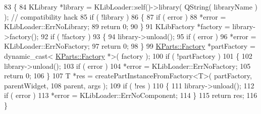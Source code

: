 \begin{DoxyCode}
83         \{
84             KLibrary *library = KLibLoader::self()->library( QString( libraryName ) ); \textcolor{comment}{// compatibility
       hack}
85             \textcolor{keywordflow}{if} ( !library )
86             \{
87                 \textcolor{keywordflow}{if} ( error )
88                     *error = KLibLoader::ErrNoLibrary;
89                 \textcolor{keywordflow}{return} 0;
90             \}
91             KLibFactory *factory = library->factory();
92             \textcolor{keywordflow}{if} ( !factory )
93             \{
94                 library->unload();
95                 \textcolor{keywordflow}{if} ( error )
96                     *error = KLibLoader::ErrNoFactory;
97                 \textcolor{keywordflow}{return} 0;
98             \}
99             \hyperlink{classKParts_1_1Factory}{KParts::Factory} *partFactory = \textcolor{keyword}{dynamic\_cast<}
      \hyperlink{classKParts_1_1Factory}{KParts::Factory} *\textcolor{keyword}{>}( factory );
100             \textcolor{keywordflow}{if} ( !partFactory )
101             \{
102                 library->unload();
103                 \textcolor{keywordflow}{if} ( error )
104                     *error = KLibLoader::ErrNoFactory;
105                 \textcolor{keywordflow}{return} 0;
106             \}
107             T *res = createPartInstanceFromFactory<T>( partFactory, parentWidget,
108                                                        parent, args );
109             \textcolor{keywordflow}{if} ( !res )
110             \{
111                 library->unload();
112                 \textcolor{keywordflow}{if} ( error )
113                     *error = KLibLoader::ErrNoComponent;
114             \}
115             \textcolor{keywordflow}{return} res;
116         \}
\end{DoxyCode}
